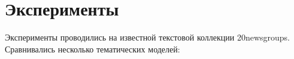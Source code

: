  


 

\section{Эксперименты} 

Эксперименты проводились на известной текстовой коллекции 20newsgroups. Сравнивались несколько тематических моделей:  

 

